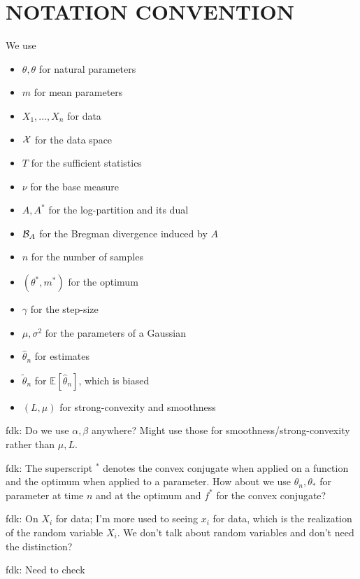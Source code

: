 \documentclass[twoside]{article}
\let\oldsection\section
\renewcommand{\section}[1]{\oldsection{\texorpdfstring{\uppercase{#1}}{#1}}}
\newcommand{\fdk}[1]{\textcolor{Periwinkle}{fdk:#1}}
\newcommand*{\expect}[2][]{\ensuremath{\mathbb{E}_{#1} \left[ #2 \right] }} %
\newcommand{\nat}{\theta}
\newcommand{\m}{m}
\begin{document}
\section{Notation convention}
We use 
\begin{itemize}
	\item $\theta, \nat$ for natural parameters
	\item $\m$ for mean parameters
	\item $X_1,\ldots,X_n$ for data
	\item ${\mathcal X}$ for the data space 
	\item $T$ for the sufficient statistics
	\item $\nu$ for the base measure
	\item $A, A^*$ for the log-partition and its dual
	\item ${\mathcal B}_A$ for the Bregman divergence induced by $A$
	\item $n$ for the number of samples
	\item $(\theta^*,m^*)$ for the optimum
	\item $\gamma$ for the step-size
	\item $\mu,\sigma^2$ for the parameters of a Gaussian
	\item $\hat\theta_n$ for estimates
	\item $\tilde\theta_n$ for $\expect{\hat\theta_n}$, which is biased
	\item $(L, \mu)$ for strong-convexity and smoothness 
\end{itemize}

\fdk{
	Do we use $\alpha, \beta$ anywhere? 
	Might use those for smoothness/strong-convexity rather than $\mu, L$.
} 

\fdk{
	The superscript ${}^*$ denotes the convex conjugate when applied on a function 
	and the optimum when applied to a parameter. 
	How about we use $\theta_n, \theta_*$ for parameter at time $n$ and at the optimum 
	and $f^*$ for the convex conjugate?
}

\fdk{
	On $X_i$ for data; I'm more used to seeing $x_i$ for data, which is the realization of the random variable $X_i$. 
	We don't talk about random variables and don't need the distinction? 
}

\fdk{
	Need to check 
}
\end{document}
